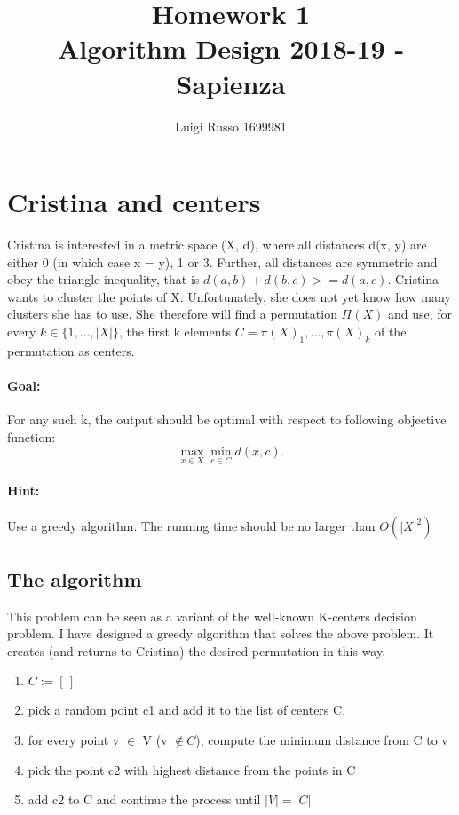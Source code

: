 \documentclass[12pt]{article}
\title{Homework 1\\
	\large Algorithm Design 2018-19 - Sapienza}
\author{Luigi Russo 1699981}
\begin{document}
	
\maketitle

\newpage
\tableofcontents
\newpage


\section{Cristina and centers}
Cristina is interested in a metric space (X, d), where all distances d(x, y) are
either 0 (in which case x = y), 1 or 3. Further, all distances are symmetric and obey the triangle inequality, that is $d(a, b) + d(b, c) >= d(a, c)$. Cristina wants to cluster the points of X. Unfortunately, she does not yet know how many clusters she has to use. She therefore will find a permutation $\Pi(X)$ and use, for every $k \in \{1, ..., |X|\}$, the first k elements $C =
{\pi(X)_1, ..., \pi(X)_k}$ of the permutation as centers.
\paragraph*{Goal:} For any such k, the output should be optimal with respect to following objective function:
\begin{equation}
\max_{x \in X} \min_{c \in C} d(x,c).
\end{equation}
\paragraph*{Hint:} Use a greedy algorithm. The running time should be no larger than $O(|X|^2)$

\subsection{The algorithm}
This problem can be seen as a variant of the well-known K-centers decision problem. I have designed a greedy algorithm that solves the above problem.
It creates (and returns to Cristina) the desired permutation in this way.
\begin{enumerate}
	\item $C:= [\,]$
	\item pick a random point c1 and add it to the list of centers C.
	\item for every point v $\in$ V (v $\notin C$), compute the minimum distance from C to v 
	\item pick the point c2 with highest distance from the points in C
	\item add c2 to C and continue the process until $|V| = |C|$
\end{enumerate}
\end{document}
